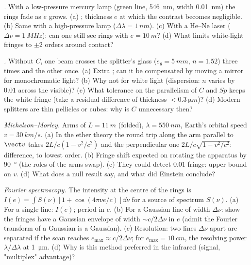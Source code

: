 \begin{exercise}[$\star\star$]\label{exo:b2:michelson:7}
\emph{.} With a low-pressure mercury lamp (green line,
\qty{546}{nm}, width \qty{0.01}{nm}) the rings fade as $e$ grows. (a) ; thickness $e$ at which the contrast becomes negligible. (b) Same
with a high-pressure lamp ($\Delta\lambda = \qty{1}{nm}$). (c) With a He--Ne laser
($\Delta\nu = \qty{1}{MHz}$): can one still see rings with $e = \qty{10}{m}$? (d) What
limits white-light fringes to $\pm2$ orders around contact?
\end{exercise}

\begin{exercise}[$\star\star$]\label{exo:b2:michelson:8}
\emph{.} Without $C$, one beam crosses the splitter's
glass ($e_g = \qty{5}{mm}$, $n = 1.52$) three times and the other once. (a)
Extra ; can it be compensated by moving a mirror for
monochromatic light? (b) Why not for white light (dispersion: $n$
varies by $0.01$ across the visible)? (c) What tolerance on the
parallelism of $C$ and $Sp$ keeps the white fringe (take a residual
difference of thickness $< \qty{0.3}{\micro m}$)? (d) Modern splitters are
thin pellicles or cubes: why is $C$ unnecessary then?
\end{exercise}

\begin{exercise}[$\star\star$]\label{exo:b2:michelson:9}
\emph{Michelson--Morley.} Arms of $L = \qty{11}{m}$ (folded), $\lambda = \qty{550}{nm}$,
Earth's orbital speed $v = \qty{30}{km/s}$. (a) In the ether theory the
round trip along the arm parallel to $\vect v$ takes $2L/c(1 - v^2/c^2)$
and the perpendicular one $2L/c\sqrt{1 - v^2/c^2}$: difference, to lowest
order. (b) Fringe shift expected on rotating the apparatus by \qty{90}{\degree}
(the roles of the arms swap). (c) They could detect $0.01$ fringe: upper
bound on $v$. (d) What does a null result say, and what did Einstein
conclude?
\end{exercise}

\begin{exercise}[$\star\star\star$]\label{exo:b2:michelson:10}
\emph{Fourier spectroscopy.} The intensity at the centre of the rings
is $I(e) = \int S(\nu)[1 + \cos(4\pi\nu e/c)]\dd\nu$ for a source of spectrum
$S(\nu)$. (a) For a single line: $I(e)$; period in $e$. (b) For a Gaussian
line of width $\Delta\nu$: show the fringes have a Gaussian envelope of
width $\sim c/2\Delta\nu$ in $e$ (admit the Fourier transform of a Gaussian
is a Gaussian). (c) Resolution: two lines $\Delta\nu$ apart are separated if
the scan reaches $e_{\max} \approx c/2\Delta\nu$; for $e_{\max} = \qty{10}{cm}$, the
resolving power $\lambda/\Delta\lambda$ at \qty{1}{\micro m}. (d) Why is this method
preferred in the infrared (signal, "multiplex" advantage)?
\end{exercise}

